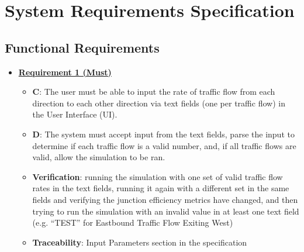 \documentclass{article}
\begin{document}
\section{System Requirements Specification}
\subsection{Functional Requirements}
\begin{itemize}
    \item \textbf{\underline{Requirement 1 (Must)}}
    \begin{itemize}
        \item \textbf{C}: The user must be able to input the rate of traffic flow from 
            each direction to each other direction via text fields (one per traffic flow) 
            in the User Interface (UI).
        \item \textbf{D}: The system must accept input from the text fields, parse the input to 
            determine if each traffic flow is a valid number, and, if all traffic flows 
            are valid, allow the simulation to be ran.
        \item \textbf{Verification}: running the simulation with one set of valid traffic 
            flow rates in the text fields, running it again with a different set in 
            the same fields and verifying the junction efficiency metrics have changed, 
            and then trying to run the simulation with an invalid value in at least one 
            text field (e.g. “TEST” for Eastbound Traffic Flow Exiting West)
        \item\textbf{Traceability}: Input Parameters section in the specification
    \end{itemize}
    

\end{itemize}
\end{document}
